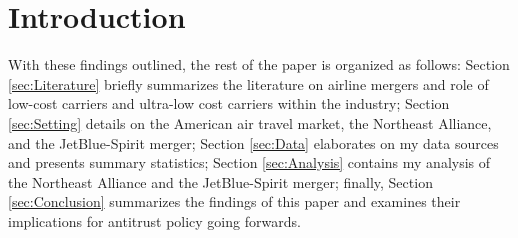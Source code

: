 \documentclass{article}
\begin{document}
    \section{Introduction}

    With these findings outlined, the rest of the paper is organized as follows: Section \ref{sec:Literature} briefly summarizes the literature on airline mergers and role of low-cost carriers and ultra-low cost carriers within the industry; Section \ref{sec:Setting} details on the American air travel market, the Northeast Alliance, and the JetBlue-Spirit merger; Section \ref{sec:Data} elaborates on my data sources and presents summary statistics; Section \ref{sec:Analysis} contains my analysis of the Northeast Alliance and the JetBlue-Spirit merger; finally, Section \ref{sec:Conclusion} summarizes the findings of this paper and examines their implications for antitrust policy going forwards. 

    
    \pagebreak 
	 
	
\end{document}
